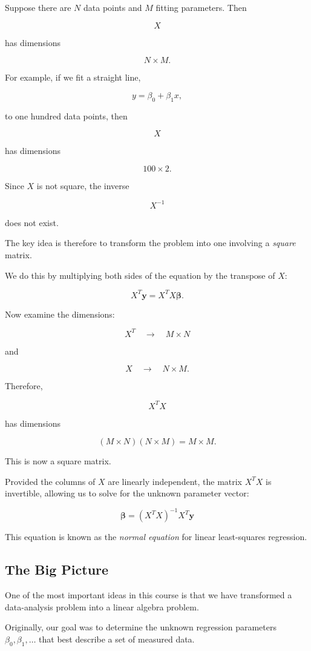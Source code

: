 \documentclass[11pt]{article}
\begin{document}
Suppose there are $N$ data points and $M$ fitting parameters. Then

\[
X
\]

has dimensions

\[
N \times M.
\]

For example, if we fit a straight line,

\[
y=\beta_0+\beta_1x,
\]

to one hundred data points, then

\[
X
\]

has dimensions

\[
100 \times 2.
\]

Since $X$ is not square, the inverse

\[
X^{-1}
\]

does not exist.

The key idea is therefore to transform the problem into one involving a
\emph{square} matrix.

We do this by multiplying both sides of the equation by the transpose of $X$:

\[
X^T\mathbf{y}=X^TX\boldsymbol{\beta}.
\]

Now examine the dimensions:

\[
X^T
\quad\rightarrow\quad
M\times N
\]

and

\[
X
\quad\rightarrow\quad
N\times M.
\]

Therefore,

\[
X^TX
\]

has dimensions

\[
(M\times N)(N\times M)
=
M\times M.
\]

This is now a square matrix.

Provided the columns of $X$ are linearly independent, the matrix $X^TX$ is
invertible, allowing us to solve for the unknown parameter vector:

\[
\boxed{
\boldsymbol{\beta}
=
(X^TX)^{-1}X^T\mathbf{y}
}
\]

This equation is known as the \emph{normal equation} for linear least-squares
regression.

\subsection*{The Big Picture}

One of the most important ideas in this course is that we have transformed a
data-analysis problem into a linear algebra problem.

Originally, our goal was to determine the unknown regression parameters
$\beta_0,\beta_1,\ldots$ that best describe a set of measured data.
\end{document}
